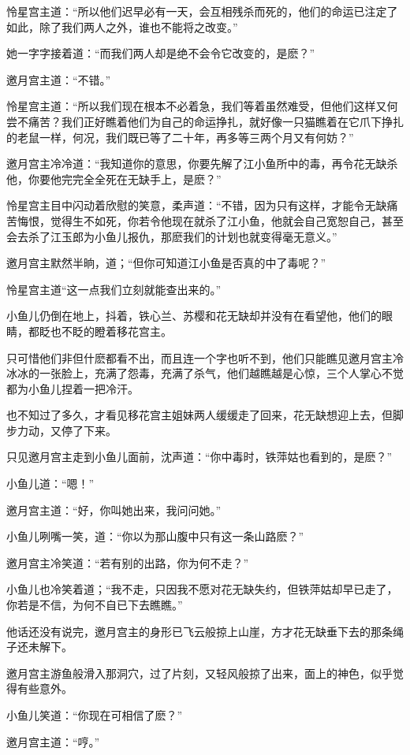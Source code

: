 \documentclass[12pt,oneside]{book}
\begin{document}
怜星宫主道：``所以他们迟早必有一天，会互相残杀而死的，他们的命运已注定了如此，除了我们两人之外，谁也不能将之改变。''

她一字字接着道：``而我们两人却是绝不会令它改变的，是麽？''

邀月宫主道：``不错。''

怜星宫主道：``所以我们现在根本不必着急，我们等着虽然难受，但他们这样又何尝不痛苦？我们正好瞧着他们为自己的命运挣扎，就好像一只猫瞧着在它爪下挣扎的老鼠一样，何况，我们既已等了二十年，再多等三两个月又有何妨？''

邀月宫主冷冷道：``我知道你的意思，你要先解了江小鱼所中的毒，再令花无缺杀他，你要他完完全全死在无缺手上，是麽？''

怜星宫主目中闪动着欣慰的笑意，柔声道：``不错，因为只有这样，才能令无缺痛苦悔恨，觉得生不如死，你若令他现在就杀了江小鱼，他就会自己宽恕自己，甚至会去杀了江玉郎为小鱼儿报仇，那麽我们的计划也就变得毫无意义。''

邀月宫主默然半晌，道；``但你可知道江小鱼是否真的中了毒呢？''

怜星宫主道``这一点我们立刻就能查出来的。''

小鱼儿仍倒在地上，抖着，铁心兰、苏樱和花无缺却并没有在看望他，他们的眼睛，都眨也不眨的瞪着移花宫主。

只可惜他们非但什麽都看不出，而且连一个字也听不到，他们只能瞧见邀月宫主冷冰冰的一张脸上，充满了怨毒，充满了杀气，他们越瞧越是心惊，三个人掌心不觉都为小鱼儿捏着一把冷汗。

也不知过了多久，才看见移花宫主姐妹两人缓缓走了回来，花无缺想迎上去，但脚步力动，又停了下来。

只见邀月宫主走到小鱼儿面前，沈声道：``你中毒时，铁萍姑也看到的，是麽？''

小鱼儿道：``嗯！''

邀月宫主道：``好，你叫她出来，我问问她。''

小鱼儿咧嘴一笑，道：``你以为那山腹中只有这一条山路麽？''

邀月宫主冷笑道：``若有别的出路，你为何不走？''

小鱼儿也冷笑着道；``我不走，只因我不愿对花无缺失约，但铁萍姑却早已走了，你若是不信，为何不自已下去瞧瞧。''

他话还没有说完，邀月宫主的身形已飞云般掠上山崖，方才花无缺垂下去的那条绳子还未解下。

邀月宫主游鱼般滑入那洞穴，过了片刻，又轻风般掠了出来，面上的神色，似乎觉得有些意外。

小鱼儿笑道：``你现在可相信了麽？''

邀月宫主道：``哼。''
\end{document}

